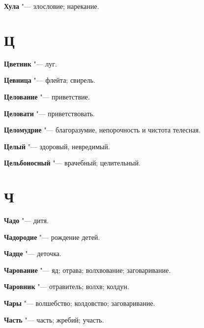 \begin{mymulticols}{2}
\noindent\textbf{Хула} "--- злословие; нарекание. 




\section{Ц}





\noindent\textbf{Цветник} "--- луг. 




\noindent\textbf{Цевница} "--- флейта; свирель. 




\noindent\textbf{Целование} "--- приветствие. 




\noindent\textbf{Целовати} "--- приветствовать. 




\noindent\textbf{Целомудрие} "--- благоразумие, непорочность и чистота телесная. 




\noindent\textbf{Целый} "--- здоровый, невредимый. 




\noindent\textbf{Цельбоносный} "--- врачебный; целительный. 




\section{Ч}





\noindent\textbf{Чадо} "--- дитя. 




\noindent\textbf{Чадородие} "--- рождение детей. 




\noindent\textbf{Чадце} "--- деточка. 




\noindent\textbf{Чарование} "--- яд; отрава; волхвование; заговаривание. 




\noindent\textbf{Чаровник} "--- отравитель; волхв; колдун. 




\noindent\textbf{Чары} "--- волшебство; колдовство; заговаривание. 




\noindent\textbf{Часть} "--- часть; жребий; участь. 





\end{mymulticols}

